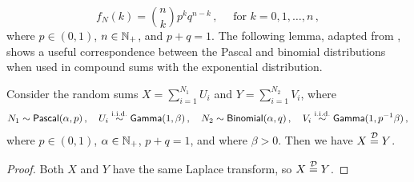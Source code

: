  \[ f_N(k) = \binom{n}{k} p^k q^{n-k} \,, \quad \text{ for }k = 0,1,\dots, n\,, \]
 where $p \in (0,1)$, $n \in \mathbb{N}_+$, and $p+q=1$. The following lemma, adapted from \cite{PaWi81}, shows a useful correspondence between the Pascal and binomial distributions when used in compound sums with the exponential distribution.
\begin{lemma} \label{lemma:BinomialPascalEquivalence}
Consider the random sums $X = \sum_{i=1}^{N_1} U_i$ and $Y = \sum_{i=1}^{N_2} V_i$, where
\[
N_1 \sim \mathsf{Pascal}(\alpha,p) \,, \quad  U_i \overset{\mathrm{i.i.d.}}{\sim} \mathsf{Gamma}(1,\beta) \,, \quad  N_2 \sim \mathsf{Binomial}(\alpha,q)  \,, \quad V_i \overset{\mathrm{i.i.d.}}{\sim} \mathsf{Gamma}(1,p^{-1} \beta) \,,
\]
where $p \in (0,1)$, $\alpha \in \mathbb{N}_+$, $p + q = 1$, and where $\beta > 0$.
Then we have $X \stackrel{{\scriptstyle \mathcal{D}}}{=} Y$.
\end{lemma}
\begin{proof}
Both $X$ and $Y$ have the same Laplace transform, so $X \stackrel{{\scriptstyle \mathcal{D}}}{=} Y$.
\end{proof}

